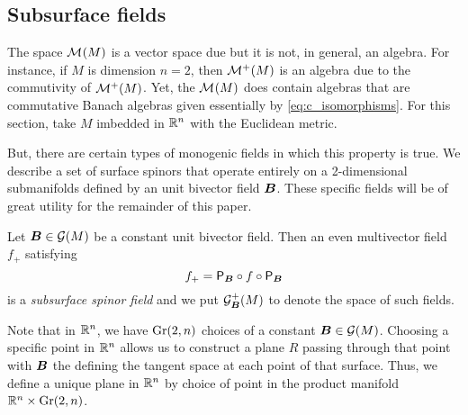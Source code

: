 \subsection{Subsurface fields}

The space $\mathcal{M}^{}(M)$ is a vector space due but it is not, in general, an algebra. For instance, if $M$ is dimension $n=2$, then $\mathcal{M}^{+}(M)$ is an algebra due to the commutivity of $\mathcal{M}^{+}(M)$. Yet, the $\mathcal{M}^{}(M)$ does contain algebras that are commutative Banach algebras given essentially by \cref{eq:c_isomorphisms}. For this section, take $M$ imbedded in $\mathbb{R}^n$ with the Euclidean metric.

But, there are certain types of monogenic fields in which this property is true. We describe a set of surface spinors that operate entirely on a 2-dimensional submanifolds defined by an unit bivector field $\boldsymbol{B}$. These specific fields will be of great utility for the remainder of this paper.
\begin{definition}
    Let $\boldsymbol{B} \in \mathcal{G}(M)$ be a constant unit bivector field. Then an even multivector field $f_+$ satisfying
    \begin{equation}
    f_+ = \mathsf{P}_{\boldsymbol{B}} \circ f \circ \mathsf{P}_{\boldsymbol{B}}
    \end{equation}
    is a \emph{subsurface spinor field} and we put $\mathcal{G}_{\boldsymbol{B}}^+(M)$ to denote the space of such fields.
\end{definition} 
Note that in $\mathbb{R}^n$, we have $\operatorname{Gr}(2,n)$ choices of a constant $\boldsymbol{B}\in \mathcal{G}(M)$. Choosing a specific point in $\mathbb{R}^n$ allows us to construct a plane $R$ passing through that point with $\boldsymbol{B}$ the defining the tangent space at each point of that surface. Thus, we define a unique plane in $\mathbb{R}^n$ by choice of point in the product manifold $\mathbb{R}^n \times \operatorname{Gr}(2,n)$.


